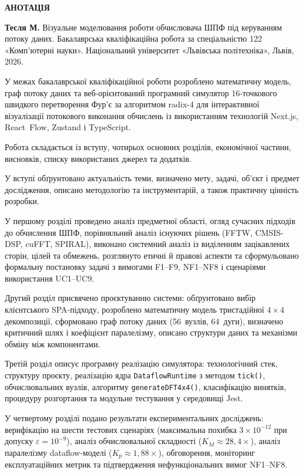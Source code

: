 {\centering\bfseries АНОТАЦІЯ\par}
\vspace{1em}

\textbf{Тесля М.} Візуальне моделювання роботи обчислювача ШПФ під
керуванням потоку даних. Бакалаврська кваліфікаційна робота за
спеціальністю 122 «Комп'ютерні науки». Національний університет
«Львівська політехніка», Львів, 2026.

У межах бакалаврської кваліфікаційної роботи розроблено математичну
модель, граф потоку даних та веб-орієнтований програмний симулятор
16-точкового швидкого перетворення Фур'є за алгоритмом radix-4 для
інтерактивної візуалізації потокового виконання обчислень із
використанням технологій Next.js, React~Flow, Zustand і TypeScript.

Робота складається із вступу, чотирьох основних розділів, економічної
частини, висновків, списку використаних джерел та додатків.

У вступі обґрунтовано актуальність теми, визначено мету, задачі,
об'єкт і предмет дослідження, описано методологію та інструментарій,
а також практичну цінність розробки.

У першому розділі проведено аналіз предметної області, огляд
сучасних підходів до обчислення ШПФ, порівняльний аналіз існуючих
рішень (FFTW, CMSIS-DSP, cuFFT, SPIRAL), виконано системний аналіз
із виділенням зацікавлених сторін, цілей та обмежень, розглянуто
етичні й правові аспекти та сформульовано формальну постановку
задачі з вимогами F1--F9, NF1--NF8 і сценаріями використання UC1--UC9.

Другий розділ присвячено проєктуванню системи: обґрунтовано вибір
клієнтського SPA-підходу, розроблено математичну модель тристадійної
$4\times4$ декомпозиції, сформовано граф потоку даних (56~вузлів,
64~дуги), визначено критичний шлях і коефіцієнт паралелізму, описано
структури даних та механізми обміну між компонентами.

Третій розділ описує програмну реалізацію симулятора: технологічний
стек, структуру проєкту, реалізацію ядра \texttt{DataflowRuntime}
з методом \texttt{tick()}, обчислювальних вузлів, алгоритму
\texttt{generateDFT4x4()}, класифікацію винятків, процедуру
розгортання та модульне тестування у середовищі Jest.

У четвертому розділі подано результати експериментальних досліджень:
верифікацію на шести тестових сценаріях (максимальна похибка
$3\times10^{-12}$ при допуску $\varepsilon=10^{-9}$), аналіз
обчислювальної складності ($K_M\approx28{,}4\times$), аналіз
паралелізму dataflow-моделі ($K_p\approx1{,}88\times$),
обговорення, моніторинг експлуатаційних метрик та підтвердження
нефункціональних вимог NF1--NF8.

